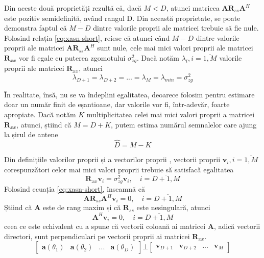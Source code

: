 Din aceste două proprietăți rezultă că, dacă $M < D$, atunci matricea
$\bm{A}\bm{R}_{ss}\bm{A}^H$ este pozitiv semidefinită, având rangul D. Din
această proprietate, se poate demonstra faptul că $M - D$ dintre valorile
proprii ale matricei trebuie să fie nule. Folosind relația
\eqref{eq:xasn-short}, reiese că atunci când $M - D$ dintre valorile proprii ale
matricei $\bm{A}\bm{R}_{ss}\bm{A}^H$ sunt nule, cele mai mici valori proprii ale
matricei $\bm{R}_{xx}$ vor fi egale cu puterea zgomotului $\sigma_{zg}^2$. Dacă
notăm $\lambda_i, i = \overline{1, M}$ valorile proprii ale matricei
$\bm{R}_{xx}$, atunci
\begin{equation}
    \lambda_{D+1} = \lambda_{D+2} = ... = \lambda_M = \lambda_{min} = \sigma_{zg}^2
\end{equation}

În realitate, însă, nu se va îndeplini egalitatea, deoarece folosim
pentru estimare doar un număr finit de eșantioane, dar valorile vor fi,
într-adevăr, foarte apropiate. Dacă notăm $K$ multiplicitatea celei mai mici
valori proprii a matricei $\bm{R}_{xx}$, atunci, știind că $M = D + K$, putem
estima numărul semnalelor care ajung la șirul de antene
\begin{equation}
    \hat{D} = M - K
\end{equation}

Din definițiile valorilor proprii și a vectorilor proprii \cite{cite:gol-89}, vectorii
proprii $\bm{v}_i, i = \overline{1, M}$ corespunzători celor mai mici valori
proprii trebuie să satisfacă egalitatea
\begin{equation}
    \bm{R}_{xx}\bm{v}_i = \sigma_{zg}^2\bm{v}_i, \quad i = \overline{D+1, M}
\end{equation}
Folosind ecuația \eqref{eq:xasn-short}, înseamnă că
\begin{equation}
    \bm{A}\bm{R}_{ss}\bm{A}^H\bm{v}_i = 0, \quad i = \overline{D+1, M}
\end{equation}
Știind că $\bm{A}$ este de rang maxim și că $\bm{R}_{ss}$ este nesingulară,
atunci
\begin{equation}
    \bm{A}^H\bm{v}_i = 0, \quad i = \overline{D+1, M}
\end{equation}
ceea ce este echivalent cu a spune că vectorii coloană ai matricei $\bm{A}$,
adică vectorii directori, sunt perpendiculari pe vectorii proprii ai matricei
$\bm{R}_{xx}$. 
\begin{equation}
    \begin{bmatrix}
	\bm{a}(\theta_1) & \bm{a}(\theta_2) & ... & \bm{a}(\theta_D)
    \end{bmatrix}
    \bot
    \begin{bmatrix}
	\bm{v}_{D+1} & \bm{v}_{D+2} & ... & \bm{v}_M
    \end{bmatrix}
\end{equation}

